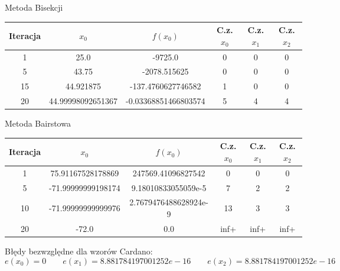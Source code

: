 \documentclass[a4paper]{article}
\begin{document}
    \begin{center}
        Metoda Bisekcji
    \end{center}
    \begin{center}
        \begin{tabular}{|c|c|c|c|c|c|} 
            \hline
            Iteracja & $x_0$ & $f(x_0)$ & C.z. $x_0$ & C.z. $x_1$ & C.z. $x_2$ \\
            \hline
            1 & 25.0 & -9725.0 & 0 & 0 & 0 \\
            \hline
            5 & 43.75 & -2078.515625 & 0 & 0 & 0 \\
            \hline
            15 & 44.921875 & -137.4760627746582 & 1 & 0 & 0 \\
            \hline
            20 & 44.99998092651367 & -0.03368851466803574 & 5 & 4 & 4 \\
            \hline
        \end{tabular}
    \end{center}
    
    \vspace{5mm}

    \begin{center}
        Metoda Bairstowa
    \end{center}
    \begin{center}
        \begin{tabular}{|c|c|c|c|c|c|} 
            \hline
            Iteracja & $x_0$ & $f(x_0)$ & C.z. $x_0$ & C.z. $x_1$ & C.z. $x_2$ \\
            \hline
            1 & 75.91167528178869 & 247569.41096827542 & 0 & 0 & 0 \\ 
            \hline
            5 & -71.99999999198174 & 9.18010833055059e-5 & 7 & 2 & 2 \\ 
            \hline
            10 & -71.99999999999976 & 2.7679476488628924e-9 & 13 & 3 & 3 \\
            \hline
            20 & -72.0 & 0.0 & inf+ & inf+ & inf+ \\
            \hline
        \end{tabular}
    \end{center}

    \vspace{5mm}

    \begin{center}
        Błędy bezwzględne dla wzorów Cardano:
        \[
            e(x_0) = 0 \qquad e(x_1) = 8.881784197001252e-16 \qquad e(x_2) = 8.881784197001252e-16  
        \]
    \end{center}
\end{document}
